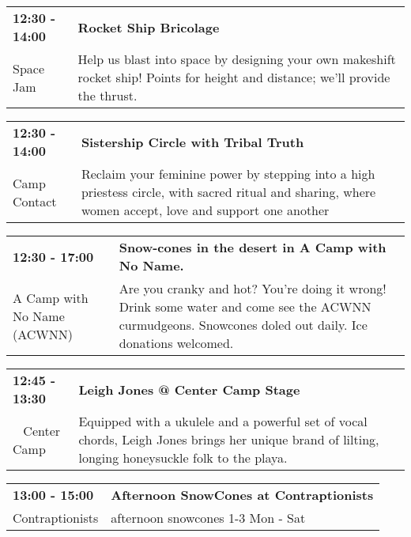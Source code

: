 \begin{tabular}{ p{1in} p{2.2in} }
    \textbf{12:30 - 14:00} & \textbf{Rocket Ship Bricolage } \\
    Space Jam \newline  & Help us blast into space by designing your own makeshift rocket ship! Points for height and distance; we'll provide the thrust. \\
    \hline 
\end{tabular}
    
\begin{tabular}{ p{1in} p{2.2in} }
    \textbf{12:30 - 14:00} & \textbf{Sistership Circle with Tribal Truth} \\
    Camp Contact \newline  & Reclaim your feminine power by stepping into a high priestess circle, with sacred ritual and sharing, where women accept, love and support one another \\
    \hline 
\end{tabular}
    
\begin{tabular}{ p{1in} p{2.2in} }
    \textbf{12:30 - 17:00} & \textbf{Snow-cones in the desert in A Camp with No Name.} \\
    A Camp with No Name (ACWNN) \newline  & Are you cranky and hot? You're doing it wrong! Drink some water and come see the ACWNN curmudgeons. Snowcones doled out daily. Ice donations welcomed. \\
    \hline 
\end{tabular}
    
\begin{tabular}{ p{1in} p{2.2in} }
    \textbf{12:45 - 13:30} & \textbf{Leigh Jones @ Center Camp Stage} \\
    ~ \newline Center Camp & Equipped with a ukulele and a powerful set of vocal chords, Leigh Jones brings her unique brand of lilting, longing honeysuckle folk to the playa. \\
    \hline 
\end{tabular}
    
\begin{tabular}{ p{1in} p{2.2in} }
    \textbf{13:00 - 15:00} & \textbf{Afternoon SnowCones at Contraptionists} \\
    Contraptionists \newline  & afternoon snowcones 1-3 Mon - Sat \\
    \hline 
\end{tabular}
    
